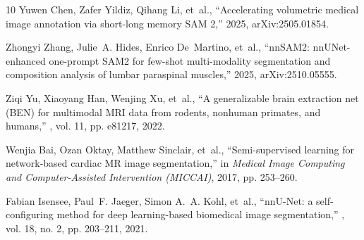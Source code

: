 {\begin{thebibliography}{10}
Yuwen Chen, Zafer Yildiz, Qihang Li, et~al.,
\newblock ``Accelerating volumetric medical image annotation via short-long
  memory {SAM} 2,'' 2025,
\newblock arXiv:2505.01854.

Zhongyi Zhang, Julie~A. Hides, Enrico De~Martino, et~al.,
\newblock ``{nnSAM2}: {nnUNet}-enhanced one-prompt {SAM2} for few-shot
  multi-modality segmentation and composition analysis of lumbar paraspinal
  muscles,'' 2025,
\newblock arXiv:2510.05555.

Ziqi Yu, Xiaoyang Han, Wenjing Xu, et~al.,
\newblock ``A generalizable brain extraction net ({BEN}) for multimodal {MRI}
  data from rodents, nonhuman primates, and humans,''
, vol. 11, pp. e81217, 2022.

Wenjia Bai, Ozan Oktay, Matthew Sinclair, et~al.,
\newblock ``Semi-supervised learning for network-based cardiac {MR} image
  segmentation,''
\newblock in {\em Medical Image Computing and Computer-Assisted Intervention
  (MICCAI)}, 2017, pp. 253--260.

Fabian Isensee, Paul~F. Jaeger, Simon A.~A. Kohl, et~al.,
\newblock ``{nnU-Net}: a self-configuring method for deep learning-based
  biomedical image segmentation,''
, vol. 18, no. 2, pp. 203--211, 2021.

\end{thebibliography}
}

